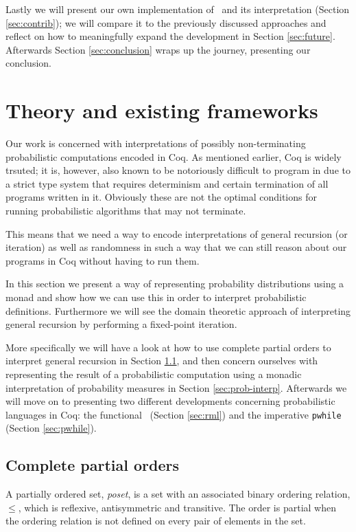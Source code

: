 \documentclass[11pt, leqno, titlepage]{article}
\theoremstyle{definition}
\begin{document}
Lastly we will present our own implementation of \rml\ and its interpretation
(Section \ref{sec:contrib}); we will compare it to the previously discussed
approaches and reflect on how to meaningfully expand the development in Section
\ref{sec:future}. Afterwards Section \ref{sec:conclusion} wraps up the journey,
presenting our conclusion.


\section{Theory and existing frameworks} 
\label{sec:theory}

Our work is concerned with interpretations of possibly non-terminating probabilistic
computations encoded in Coq. As mentioned earlier, Coq is widely trsuted; it is,
however, also known to be notoriously difficult to program in due to a strict
type system that requires determinism and certain termination of all programs written
in it. Obviously these are not the optimal conditions for running probabilistic
algorithms that may not terminate.

This means that we need a way to encode interpretations of general recursion (or
iteration) as well as randomness in such a way that we can still reason about our
programs in Coq without having to run them.

In this section we present a way of representing probability distributions using a
monad and show how we can use this in order to interpret probabilistic
definitions. Furthermore we will see the domain theoretic approach of interpreting
general recursion by performing a fixed-point iteration.

More specifically we will have a look at how to use complete partial orders to
interpret general recursion in Section \ref{sec:cpos}, and then concern ourselves
with representing the result of a probabilistic computation using a monadic
interpretation of probability measures in Section \ref{sec:prob-interp}. Afterwards
we will move on to presenting two different developments concerning probabilistic
languages in Coq: the functional \rml\ (Section \ref{sec:rml}) and the imperative
\texttt{pwhile} (Section \ref{sec:pwhile}).

\subsection{Complete partial orders}
\label{sec:cpos}
A partially ordered set, \textit{poset}, is a set with an associated binary ordering
relation, $\leq$, which is reflexive, antisymmetric and transitive. The order is
partial when the ordering relation is not defined on every pair of elements in the
set.
\end{document}
